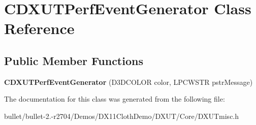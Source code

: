 \hypertarget{class_c_d_x_u_t_perf_event_generator}{\section{C\+D\+X\+U\+T\+Perf\+Event\+Generator Class Reference}
\label{class_c_d_x_u_t_perf_event_generator}
}
\subsection*{Public Member Functions}
\begin{DoxyCompactItemize}
\item 
\hypertarget{class_c_d_x_u_t_perf_event_generator_a4fb7131bffda9ab671635c039bf90d31}{{\bfseries C\+D\+X\+U\+T\+Perf\+Event\+Generator} (D3\+D\+C\+O\+L\+O\+R color, L\+P\+C\+W\+S\+T\+R pstr\+Message)}\label{class_c_d_x_u_t_perf_event_generator_a4fb7131bffda9ab671635c039bf90d31}

\end{DoxyCompactItemize}


The documentation for this class was generated from the following file\+:\begin{DoxyCompactItemize}
\item 
bullet/bullet-\/2.-\/r2704/\+Demos/\+D\+X11\+Cloth\+Demo/\+D\+X\+U\+T/\+Core/D\+X\+U\+Tmisc.\+h\end{DoxyCompactItemize}

